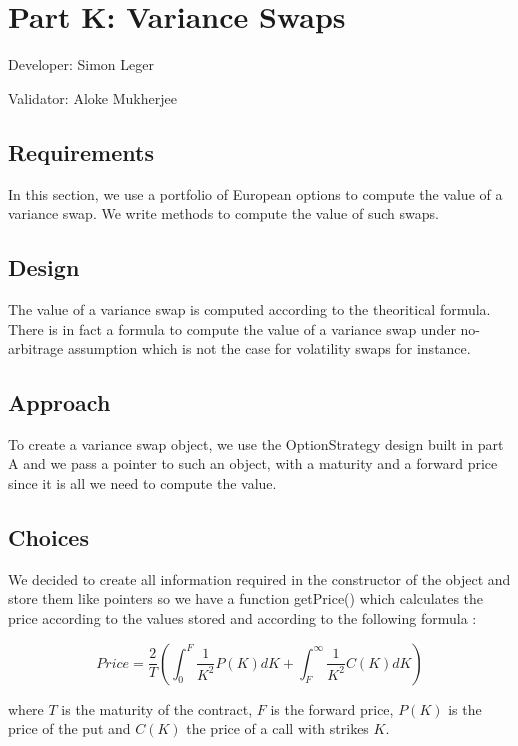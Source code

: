 \chapter{Part K: Variance Swaps}
Developer: Simon Leger

\noindent Validator: Aloke Mukherjee



\section{Requirements}

In this section, we use a portfolio of European options to compute
the value of a variance swap. We write methods to compute the value of such swaps.


\section{Design }

The value of a variance swap is computed according to the theoritical formula. 
There is in fact a formula to compute the value of a variance swap under 
no-arbitrage assumption which is not the case for volatility swaps for instance.

\section{Approach}
To create a variance swap object, we use the OptionStrategy design
built in part A and we pass a pointer to such an object, with a
maturity and a forward price since it is all we need to compute
the value.


\section{Choices}
We decided to create all information required in the constructor
of the object and store them like pointers so we have a function
getPrice() which calculates the price according to the values
stored and according to the following formula :

$$Price=\frac{2}{T}\left(\int_0^F\frac{1}{K^2}P(K)dK+\int_F^\infty \frac{1}{K^2}C(K)dK\right)$$

where $T$ is the maturity of the contract, $F$ is the forward price,
$P(K)$ is the price of the put and $C(K)$ the price of a call with
strikes $K$.


